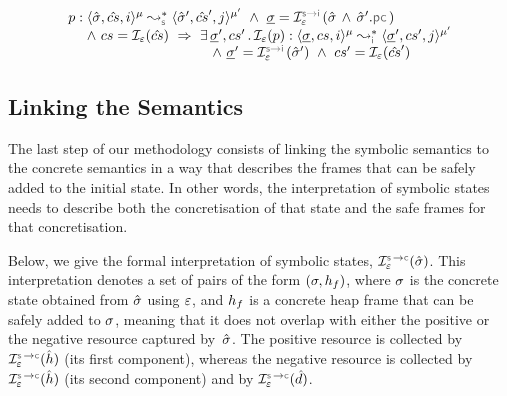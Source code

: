 \begin{theorem}\label{lemma:soundness:jsil:symb:exe:instrumented:instrumented}
\vspace*{-0.1cm}
$$
\begin{array}{l}
\prog : \transabssemrule{\sstate, \scs, i}{\sstate', \scs', j}{\mode}{\mode'}{\symbolic} \ \wedge \ \istate = \interpret{\symbinst}{\senv}(\sstate \, \wedge \, \sstate'.\pcsel) \\ \quad \ \wedge \ \cs = \shorthand(\scs) \ \Rightarrow \ \exists \, \istate', \cs' \, . \, 
        \shorthand(\prog) : \transabssemrule{\istate, \cs, i}{\istate', \cs', j}{\mode}{\mode'}{\instrumented} \\ \quad \quad \quad \quad  \quad \quad \quad \quad  \quad \quad
             \ \wedge \ \istate' = \interpret{\symbinst}{\senv}(\sstate')  \ \wedge \ \cs' = \shorthand(\scs')
\end{array}
$$
\end{theorem}



\vspace*{-0.25cm}
\subsection{Linking the Semantics}\label{sex:formal:guarantees}

The last step of our methodology consists of linking the symbolic semantics to the concrete semantics in a way that describes the frames that can be safely added to the initial state.  
In other words, the interpretation of symbolic states needs to describe both the concretisation of that state and the safe frames for that concretisation. 

Below, we give the formal interpretation of symbolic states, 
$\interpret{\symbconc}{\senv}(\sstate)$. This interpretation denotes a set of pairs of the form $(\sigma, h_f)$,
where $\sigma$ is the concrete state obtained from $\hat{\sigma}$ using $\varepsilon$, and $h_f$ is
a concrete heap frame that can be safely added to $\sigma$, meaning that it does not overlap with either the positive or the negative resource captured by~$\hat{\sigma}$. The positive resource is collected by $\interpret{\symbconc}{\senv}(\sheap)$ (its first component), whereas the negative resource is collected by $\interpret{\symbconc}{\senv}(\sheap)$ (its second component) and by $\interpret{\symbconc}{\senv}(\sdom)$. 

